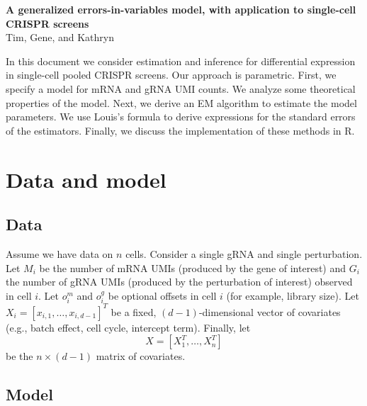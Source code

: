 \documentclass[12pt]{article}
\begin{document}
\begin{center}
\textbf{A generalized errors-in-variables model, with application to single-cell CRISPR screens} \\
Tim, Gene, and Kathryn
\end{center}


In this document we consider estimation and inference for differential expression in single-cell pooled CRISPR screens. Our approach is parametric. First, we specify a model for mRNA and gRNA UMI counts. We analyze some theoretical properties of the model. Next, we derive an EM algorithm to estimate the model parameters. We use Louis's formula \cite{Louis1982} to derive expressions for the standard errors of the estimators. Finally, we discuss the implementation of these methods in R.

\section{Data and model}

\subsection{Data}

Assume we have data on $n$ cells. Consider a single gRNA and single perturbation. Let $M_i$ be the number of mRNA UMIs (produced by the gene of interest) and $G_i$ the number of gRNA UMIs (produced by the perturbation of interest) observed in cell $i$. Let $o^m_i$ and $o^g_i$ be optional offsets in cell $i$ (for example, library size). Let $X_i = [x_{i,1}, \dots, x_{i,d-1}]^T$ be a fixed, $(d-1)$-dimensional vector of covariates (e.g., batch effect, cell cycle, intercept term). Finally, let
$$ X = [X_1^T, \dots, X_n^T]$$ be the $n \times (d-1)$ matrix of covariates.

\subsection{Model}
\end{document}
